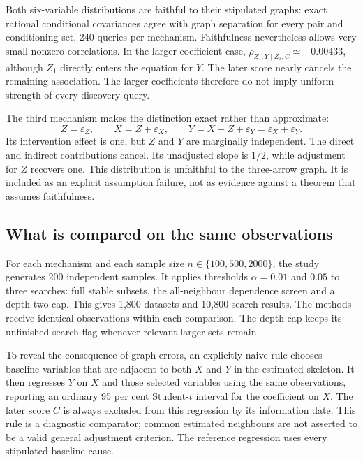 Both six-variable distributions are faithful to their stipulated graphs:
exact rational conditional covariances agree with graph separation for every
pair and conditioning set, 240 queries per mechanism. Faithfulness nevertheless
allows very small nonzero correlations. In the larger-coefficient case,
$\rho_{Z_1,Y\mid Z_3,C}\simeq-0.00433$, although $Z_1$ directly enters the
equation for $Y$. The later score nearly cancels the remaining association.
The larger coefficients therefore do not imply uniform strength of every
discovery query.

The third mechanism makes the distinction exact rather than approximate:
\begin{equation}
 Z=\varepsilon_Z,\qquad X=Z+\varepsilon_X,\qquad
 Y=X-Z+\varepsilon_Y=\varepsilon_X+\varepsilon_Y.
 \label{closure30:cancellation}
\end{equation}
Its intervention effect is one, but $Z$ and $Y$ are marginally independent.
The direct and indirect contributions cancel. Its unadjusted slope is $1/2$,
while adjustment for $Z$ recovers one. This distribution is unfaithful to the
three-arrow graph. It is included as an explicit assumption failure, not as
evidence against a theorem that assumes faithfulness.

\subsection{What is compared on the same observations}

For each mechanism and each sample size $n\in\{100,500,2000\}$, the study
generates 200 independent samples. It applies thresholds $\alpha=0.01$ and
$0.05$ to three searches: full stable subsets, the all-neighbour dependence
screen and a depth-two cap. This gives 1,800 datasets and 10,800 search results.
The methods receive identical observations within each comparison. The depth
cap keeps its unfinished-search flag whenever relevant larger sets remain.

To reveal the consequence of graph errors, an explicitly naive rule chooses
baseline variables that are adjacent to both $X$ and $Y$ in the estimated
skeleton. It then regresses $Y$ on $X$ and those selected variables using the
same observations, reporting an ordinary 95 per cent Student-$t$ interval for
the coefficient on $X$. The later score $C$ is always excluded from this
regression by its information date. This rule is a diagnostic comparator;
common estimated neighbours are not asserted to be a valid general adjustment
criterion. The reference regression uses every stipulated baseline cause.

